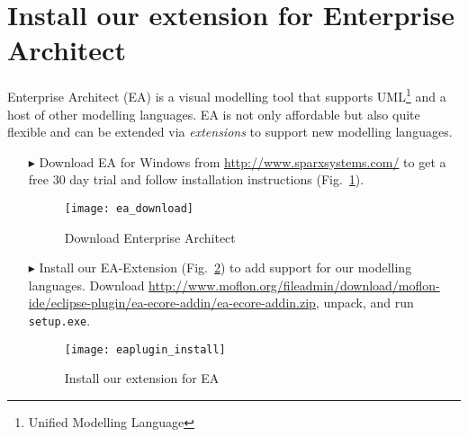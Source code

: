 \newpage
\visHeader

\section{Install our extension for Enterprise Architect}
\label{stepOne}
Enterprise Architect (EA) is a visual modelling tool that supports UML\footnote{Unified Modelling Language} and a host of other modelling languages.
EA is not only affordable but also quite flexible and can be extended via \emph{extensions} to support new modelling languages.
\begin{enumerate}
  
\item[$\blacktriangleright$] Download EA for Windows from \url{http://www.sparxsystems.com/} to get a free 30 day trial and follow installation instructions (Fig.~\ref{fig_enterpriseArchitextHomepage}).

\begin{figure}[htbp]
	\centering
  	\texttt{[image: ea\_download]}
	\caption{Download Enterprise Architect}
	\label{fig_enterpriseArchitextHomepage}
\end{figure} 

\item[$\blacktriangleright$] Install our EA-Extension (Fig.~\ref{fig_eaPluginWizard}) to add support for our modelling languages.
Download \url{http://www.moflon.org/fileadmin/download/moflon-ide/eclipse-plugin/ea-ecore-addin/ea-ecore-addin.zip}, unpack, and run \texttt{setup.exe}.

\begin{figure}[htbp]
	\centering
  \texttt{[image: eaplugin\_install]}
	\caption{Install our extension for EA}
	\label{fig_eaPluginWizard}
\end{figure}
\end{enumerate}
 

\clearpage
\texHeader
\mbox{}
\clearpage


\visHeader


